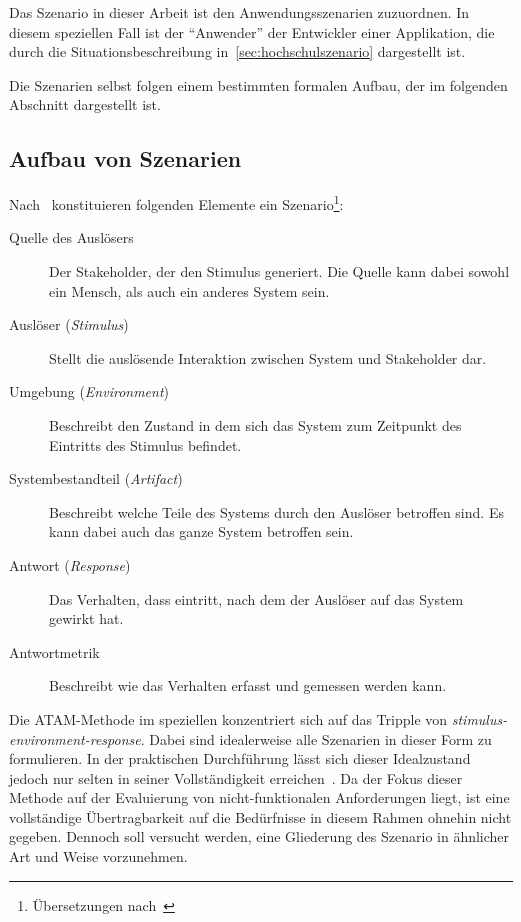   Das Szenario in dieser Arbeit ist den Anwendungsszenarien zuzuordnen. In diesem speziellen Fall ist der "`Anwender"' der Entwickler einer Applikation, die durch die Situationsbeschreibung in~\ref{sec:hochschulszenario} dargestellt ist.
  
  Die Szenarien selbst folgen einem bestimmten formalen Aufbau, der im folgenden Abschnitt dargestellt ist.


\subsection{Aufbau von Szenarien} %
\label{sub:aufbau_von_szenarien}

  Nach~\citep[S. 75]{software_architecture_in_practice} konstituieren folgenden Elemente ein Szenario\footnote{Übersetzungen nach~\citep[S. 63]{effektive_software_architekturen}}:
  
  \begin{description}
    \item[Quelle des Auslösers] Der Stakeholder, der den Stimulus generiert. Die Quelle kann dabei sowohl ein Mensch, als auch ein anderes System sein.
    \item[Auslöser (\emph{Stimulus})] Stellt die auslösende Interaktion zwischen System und Stakeholder dar.
    \item[Umgebung (\emph{Environment})] Beschreibt den Zustand in dem sich das System zum Zeitpunkt des Eintritts des Stimulus befindet.
    \item[Systembestandteil (\emph{Artifact})] Beschreibt welche Teile des Systems durch den Auslöser betroffen sind. Es kann dabei auch das ganze System betroffen sein.
    \item[Antwort (\emph{Response})] Das Verhalten, dass eintritt, nach dem der Auslöser auf das System gewirkt hat.
    \item[Antwortmetrik] Beschreibt wie das Verhalten erfasst und gemessen werden kann.
  \end{description}
  
  Die ATAM-Methode im speziellen konzentriert sich auf das Tripple von \emph{stimulus-environ\-ment-response}. Dabei sind idealerweise alle Szenarien in dieser Form zu formulieren. In der praktischen Durchführung lässt sich dieser Idealzustand jedoch nur selten in seiner Vollständigkeit erreichen~\citep[S. 53]{evaluating_software_architectures}. Da der Fokus dieser Methode auf der Evaluierung von nicht-funktionalen Anforderungen liegt, ist eine vollständige Übertragbarkeit auf die Bedürfnisse in diesem Rahmen ohnehin nicht gegeben. Dennoch soll versucht werden, eine Gliederung des Szenario in ähnlicher Art und Weise vorzunehmen.

